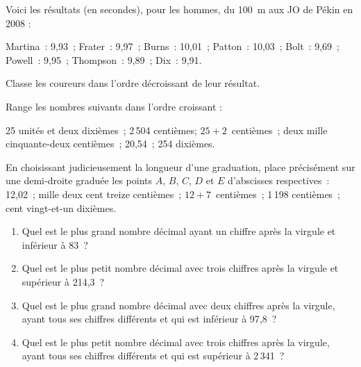 \newpage          %


\begin{exercice}
Voici les résultats (en secondes), pour les hommes, du 100 m aux JO de Pékin en 2008 : \vspace{0.75em}

Martina : 9,93 ; Frater : 9,97 ; Burns : 10,01 ; Patton : 10,03 ; Bolt : 9,69 ; Powell : 9,95 ; Thompson : 9,89 ; Dix : 9,91.\vspace{0.75em}

Classe les coureurs dans l'ordre décroissant de leur résultat.
\end{exercice}


\begin{exercice}[À ordonner]
Range les nombres suivants dans l'ordre croissant : \vspace{0.75em}

25 unités et deux dixièmes ; 2\,504 centièmes; $25 + 2$ centièmes ; deux mille cinquante‑deux centièmes ; 20,54 ; 254 dixièmes.
\end{exercice}


\begin{exercice}[À placer]
En choisissant judicieusement la longueur d'une graduation, place précisément sur une demi‑droite graduée les points $A$, $B$, $C$, $D$ et $E$ d'abscisses respectives : \\[0.75em]
12,02 ; mille deux cent treize centièmes ; $12 + 7$ centièmes ; 1\,198 centièmes ; cent vingt-et-un dixièmes.
\end{exercice}


\begin{exercice}[Comparaison]
\begin{enumerate}
 \item Quel est le plus grand nombre décimal ayant un chiffre après la virgule et inférieur à 83 ?
 \item Quel est le plus petit nombre décimal avec trois chiffres après la virgule et supérieur à 214,3 ?
 \item Quel est le plus grand nombre décimal avec deux chiffres après la virgule, ayant tous ses chiffres différents et qui est inférieur à 97,8 ?
 \item Quel est le plus petit nombre décimal avec trois chiffres après la virgule, ayant tous ses chiffres différents et qui est supérieur à 2\,341 ?
 \end{enumerate}
\end{exercice}


